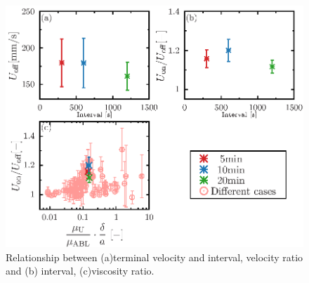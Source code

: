 \begin{figure}[H]
    \centering
    \includegraphics[width=1\textwidth]{./X-Appendix/interval/interval_cal.eps}
    \caption{ Relationship between (a)terminal velocity and interval, velocity ratio and (b) interval, (c)viscosity ratio.}
    \label{fig:falling-interval-diff}
\end{figure}
